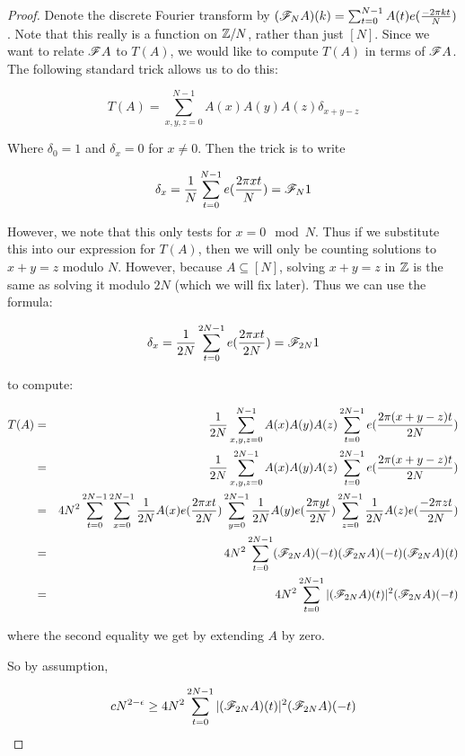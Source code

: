 \documentclass{article}
\theoremstyle{definition}
\theoremstyle{remark}
\numberwithin{equation}{section}
\begin{document}
\begin{proof}
  Denote the discrete Fourier transform by
  $(\mathscr{F}_N A)(k) = \sum_{t=0}^{N-1} A(t) e(\frac{-2\pi k t}{N})$.
  Note that this really is a function on $\mathbb{Z}/N$, rather than just
  $[N]$.  Since we want to relate $\mathscr{F} A$ to $T(A)$, we would like to
  compute $T(A)$ in terms of $\mathscr{F} A$.  The following standard trick
  allows us to do this: 

  \[T(A) = \sum_{x, y, z = 0}^{N-1} A(x)A(y)A(z)\delta_{x+y-z}\]

  Where $\delta_0 = 1$ and $\delta_x = 0$ for $x \neq 0$.  Then the
  trick is to write 

  \[\delta_x = \frac{1}{N} \sum_{t=0}^{N-1} e(\frac{2\pi x t}{N}) = \mathscr{F}_N 1\]

  However, we note that this only tests for $x = 0 \mod{N}$.  Thus if
  we substitute this into our expression for $T(A)$, then we will only
  be counting solutions to $x+y=z$ modulo $N$.  However, because
  $A \subseteq [N]$, solving $x+y=z$ in $\mathbb{Z}$ is the same as solving it
  modulo $2N$ (which we will fix later).  Thus we can use the formula:

  \[\delta_x = \frac{1}{2N} \sum_{t=0}^{2N-1} e(\frac{2\pi x t}{2N}) = \mathscr{F}_{2N} 1\]

  to compute: 

  \begin{eqnarray*}
    T(A) &=& \frac{1}{2N}\sum_{x, y, z = 0}^{N-1} A(x)A(y)A(z)\sum_{t=0}^{2N-1}
             e(\frac{2\pi (x+y-z) t}{2N})\\
         &=& \frac{1}{2N}\sum_{x, y, z = 0}^{2N-1} A(x)A(y)A(z)\sum_{t=0}^{2N-1}
             e(\frac{2\pi (x+y-z) t}{2N})\\
         &=& 4N^2 \sum_{t=0}^{2N-1}
             \sum_{x=0}^{2N-1} \frac{1}{2N} A(x)e(\frac{2\pi x t}{2N}) 
             \sum_{y=0}^{2N-1} \frac{1}{2N} A(y)e(\frac{2\pi y t}{2N}) 
             \sum_{z=0}^{2N-1} \frac{1}{2N} A(z)e(\frac{-2\pi z t}{2N})\\
         &=& 4 N^2 \sum_{t=0}^{2N-1} (\mathscr{F}_{2N}A)(-t)(\mathscr{F}_{2N}A)(-t)(\mathscr{F}_{2N}A)(t)\\
         &=& 4 N^2 \sum_{t=0}^{2N-1} |(\mathscr{F}_{2N}A)(t)|^2(\mathscr{F}_{2N}A)(-t)
  \end{eqnarray*}
  
  where the second equality we get by extending $A$ by zero.  
  
  So by assumption, 

  \[cN^{2-\epsilon} \geq 4 N^2 \sum_{t=0}^{2N-1} |(\mathscr{F}_{2N}A)(t)|^2(\mathscr{F}_{2N}A)(-t)\]


\end{proof}
\end{document}
